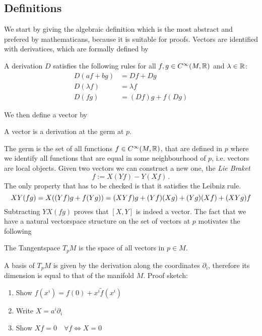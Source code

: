 \subsection*{Definitions}
We start by giving the algebraic definition which is the most
abstract and prefered by mathematicans, because it is suitable for proofs.
Vectors are identified with derivatices, which are formally defined by
\begin{definition}[Derivation]
A derivation $D$ satisfies the following rules for all $f,g\in
C^\infty(M,\mathbb{R})$ and $\lambda \in \mathbb{R}$:
\begin{align}
    D(af+bg) &=Df+Dg\\
    D(\lambda f)&=\lambda f\\
    D(fg)&= (Df)g+f(Dg)
\end{align}
\end{definition}
We then define a vector by 
\begin{definition} A vector is a derivation at the germ at $p$.
\end{definition}
The germ is the set of all functions $f\in C^\infty(M,\mathbb{R})$, that are defined
in $p$ where we identify all functions that are equal in some neighbourhood
of $p$, i.e. vectors are local objects.
Given two vectors we can construct a new one, the \emph{Lie Braket}
\begin{equation}
    [X,Y]f:=X(Yf)-Y(Xf)\, .
\end{equation}
The only property that has to be checked is that it satisfies the Leibniz rule.
\begin{equation}
    XY(fg)=X((Yf)g+f(Yg))=(XYf)g+(Yf)(Xg)+(Yg)(Xf)+(XYg)f\\
\end{equation}
Subtracting $YX(fg)$ proves that $[X,Y]$ is indeed a vector. The fact that we
have a natural vectorspace structure on the set of vectors at $p$ motivates the
following
\begin{definition}
The Tangentspace $T_pM$ is the space of all vectors in $p\in M$.
\end{definition}
A basis of $T_pM$ is given by the derivation along the
coordinates $\partial_i$, therefore its dimension is equal to that of the manifold $M$.
Proof sketch:
\begin{enumerate}
    \item Show $f(x^i)=f(0)+x^i\tilde{f}(x^i)$
    \item Write $X=a^i\partial_i$
    \item Show $Xf=0\quad \forall f \iff X=0$
\end{enumerate}
